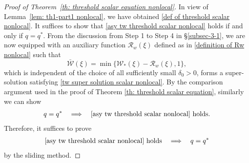 \documentclass[11pt,a4paper]{article}
\numberwithin{equation}{section}
\numberwithin{figure}{section}
\newcommand\bea{\begin{eqnarray}}
\newcommand\eea{\end{eqnarray}}
\newcommand\beaa{\begin{eqnarray*}}
\newcommand\eeaa{\end{eqnarray*}}
\begin{document}
\begin{proof}[Proof of Theorem~\ref{th: threshold scalar equation nonlocal}]
In view of Lemma~\ref{lem: th1-part1 nonlocal}, we have obtained \eqref{def of threshold scalar nonlocal}.
It suffices to show that \eqref{asy tw threshold scalar nonlocal} holds if and only if $q=q^*$.
From the discussion from Step 1 to Step 4 in \S \ref{subsec-3-1},
we are now equipped with an auxiliary function $\mathcal{R}_w(\xi)$ %
defined as in \eqref{definition of Rw nonlocal} such that 
$$\bar{\mathcal W} (\xi)=\min \{\mathcal{W}_*(\xi)-\mathcal{R}_w(\xi),1\},$$
 which is independent of the choice of all sufficiently small $\delta_0>0$, forms
a super-solution satisfying \eqref{tw super solution scalar nonlocal}. By the comparison argument used in the proof of Theorem \ref{th: threshold scalar equation}, similarly we can show
\beaa%
q=q^* \quad \Longrightarrow \quad \mbox{\eqref{asy tw threshold scalar nonlocal} holds}.
\eeaa
Therefore, it suffices to prove
\bea\label{th1:goal-2 nonlocal}
\mbox{\eqref{asy tw threshold scalar nonlocal} holds} \quad \Longrightarrow \quad q=q^*
\eea
by the sliding method.


\end{proof}
\end{document}
